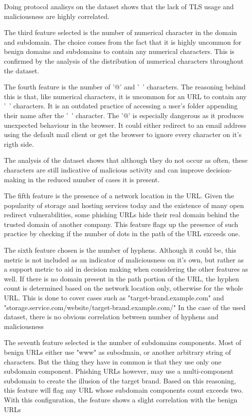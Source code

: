 Doing protocol analisys on the dataset shows that the lack of TLS usage and maliciousness are highly correlated.

The third feature selected is the number of numerical character in the domain and subdomain. The choice comes from the fact that it is highly uncommon for benign domains and subdomains to contain any numerical characters. This is confirmed by the analysis of the distribution of numerical characters throughout the dataset.

The fourth feature is the number of '@' and '~' characters. The reasoning behind this is that, like numerical characters, it is uncommon for an URL to contain any '~' characters. It is an outdated practice of accessing a user's folder appending their name after the '~' character.
The '@' is especially dangerous as it produces unexpected behaviour in the browser. It could either redirect to an email address using the default mail client or get the browser to ignore every character on it's rigth side.

The analysis of the dataset shows that although they do not occur as often, these characters are still indicative of malicious activity and can improve decision-making in the reduced number of cases it is present.


The fifth feature is the presence of a network location in the URL. Given the popularity of storage and hosting services today and the existence of many open redirect vulnerabilities, some phishing URLs hide their real domain behind the trusted domain of another company. This feature flags up the presence of such practice by checking if the number of dots in the path of the URL exceeds one.

The sixth feature chosen is the number of hyphens. Although it could be, this metric is not included as an indicator of maliciousness on it's own, but rather as a support metric to aid in decision making when considering the other features as well. If there is no domain present in the path portion of the URL, the hyphen count is determined based on the network location only, otherwise for the whole URL. This is done to cover cases such as "target-brand.example.com" and "storage.service.com/website/target-brand.example.com/"
In the case of the used dataset, there is no obvious correlation between number of hyphens and maliciousness

The seventh feature selected is the number of subdomains components. Most of benign URLs either use "www" as subodmain, or another arbitrary string of characters. But the thing they have in common is that they use only one subdomain component. Phishing URLs however, may use a multi-component subdomain to create the illusion of the target brand. Based on this reasoning, this feature will flag any URL whose subdomain components count exceeds two. With this configuration, the feature shows a slight correlation with the benign URLs 

